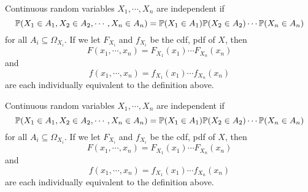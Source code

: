 \begin{note}
  \begin{field}
    \begin{defi}
      Continuous random variables $X_1, \cdots, X_n$ are independent if
      \[
        \P(X_1\in A_1, X_2 \in A_2, \cdots, X_n\in A_n) = \P(X_1 \in A_1)\P(X_2 \in A_2) \cdots \P(X_n \in A_n)
      \]
      for all $A_i\subseteq \Omega_{X_i}$.
      If we let $F_{X_i}$ and $f_{X_i}$ be the cdf, pdf of $X$, then
      \[
        F(x_1, \cdots, x_n) = F_{X_1}(x_1)\cdots F_{X_n}(x_n)
      \]
      and
      \[
        f(x_1, \cdots, x_n) = f_{X_1}(x_1) \cdots f_{X_n}(x_n)
      \]
      are each individually equivalent to the definition above.
    \end{defi}
  \end{field}
  \begin{field}
    \begin{defi}
      Continuous random variables $X_1, \cdots, X_n$ are independent if
      \[
        \P(X_1\in A_1, X_2 \in A_2, \cdots, X_n\in A_n) = \P(X_1 \in A_1)\P(X_2 \in A_2) \cdots \P(X_n \in A_n)
      \]
      for all $A_i\subseteq \Omega_{X_i}$.
      If we let $F_{X_i}$ and $f_{X_i}$ be the cdf, pdf of $X$, then
      \[
        F(x_1, \cdots, x_n) = F_{X_1}(x_1)\cdots F_{X_n}(x_n)
      \]
      and
      \[
        f(x_1, \cdots, x_n) = f_{X_1}(x_1) \cdots f_{X_n}(x_n)
      \]
      are each individually equivalent to the definition above.
    \end{defi}
  \end{field}
  \xplain{}%
\end{note}

